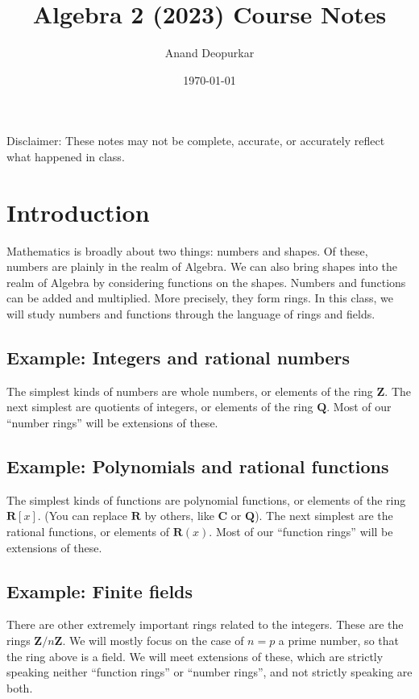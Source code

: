 \documentclass[11pt]{article}
\author{Anand Deopurkar}
\date{\today}
\title{Algebra 2 (2023) Course Notes}
\begin{document}
\maketitle
\setcounter{tocdepth}{1}
\tableofcontents

Disclaimer: These notes may not be complete, accurate, or accurately reflect what happened in class.
\section{Introduction}
\label{sec:orgdea36c2}
Mathematics is broadly about two things: numbers and shapes.
Of these, numbers are plainly in the realm of Algebra.
We can also bring shapes into the realm  of Algebra by considering functions on the shapes.
Numbers and functions can be added and multiplied.
More precisely, they form rings.
In this class, we will study numbers and functions through the language of rings and fields.
\subsection{Example: Integers and rational numbers}
\label{sec:org1554525}
The simplest kinds of numbers are whole numbers, or elements of the ring \(\mathbf{Z}\).
The next simplest are quotients of integers, or elements of the ring \(\mathbf{Q}\).
Most of our ``number rings'' will be extensions of these.
\subsection{Example: Polynomials and rational functions}
\label{sec:org60d27d5}
The simplest kinds of functions are polynomial functions, or elements of the ring \(\mathbf{R}[x]\).
(You can replace \(\mathbf{R}\) by others, like \(\mathbf{C}\) or \(\mathbf{Q}\)).
The next simplest are the rational functions, or elements of \(\mathbf{R}(x)\).
Most of our ``function rings'' will be extensions of these.
\subsection{Example: Finite fields}
\label{sec:orgd368d09}
There are other extremely important rings related to the integers.
These are the rings \(\mathbf{Z}/n \mathbf{Z}\).
We will mostly focus on the case of \(n = p\) a prime number, so that the ring above is a field.
We will meet extensions of these, which are strictly speaking neither ``function rings'' or ``number rings'', and not strictly speaking are both. 
\end{document}
